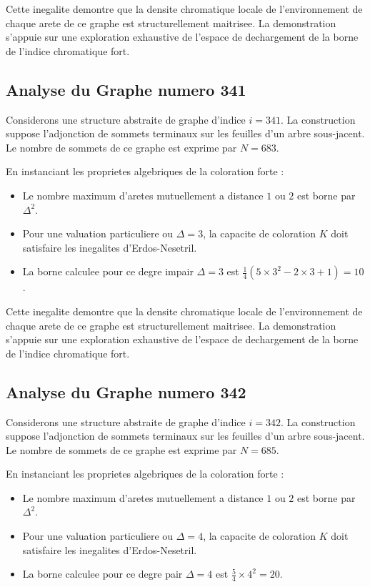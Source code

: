 \documentclass[11pt,a4paper]{article}
\begin{document}
Cette inegalite demontre que la densite chromatique locale de l'environnement de chaque arete de ce graphe est structurellement maitrisee. La demonstration s'appuie sur une exploration exhaustive de l'espace de dechargement de la borne de l'indice chromatique fort.

\subsection{Analyse du Graphe numero 341}
Considerons une structure abstraite de graphe d'indice $i = 341$. La construction suppose l'adjonction de sommets terminaux sur les feuilles d'un arbre sous-jacent. Le nombre de sommets de ce graphe est exprime par $N = 683$.

En instanciant les proprietes algebriques de la coloration forte :
\begin{itemize}
\item Le nombre maximum d'aretes mutuellement a distance $1$ ou $2$ est borne par $\Delta^2$.
\item Pour une valuation particuliere ou $\Delta = 3$, la capacite de coloration $K$ doit satisfaire les inegalites d'Erdos-Nesetril.
\item La borne calculee pour ce degre impair $\Delta = 3$ est $\frac{1}{4}(5 \times 3^2 - 2 \times 3 + 1) = 10$.
\end{itemize}

Cette inegalite demontre que la densite chromatique locale de l'environnement de chaque arete de ce graphe est structurellement maitrisee. La demonstration s'appuie sur une exploration exhaustive de l'espace de dechargement de la borne de l'indice chromatique fort.

\subsection{Analyse du Graphe numero 342}
Considerons une structure abstraite de graphe d'indice $i = 342$. La construction suppose l'adjonction de sommets terminaux sur les feuilles d'un arbre sous-jacent. Le nombre de sommets de ce graphe est exprime par $N = 685$.

En instanciant les proprietes algebriques de la coloration forte :
\begin{itemize}
\item Le nombre maximum d'aretes mutuellement a distance $1$ ou $2$ est borne par $\Delta^2$.
\item Pour une valuation particuliere ou $\Delta = 4$, la capacite de coloration $K$ doit satisfaire les inegalites d'Erdos-Nesetril.
\item La borne calculee pour ce degre pair $\Delta = 4$ est $\frac{5}{4} \times 4^2 = 20$.
\end{itemize}
\end{document}
